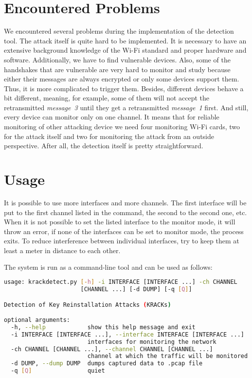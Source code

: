 \section{Encountered Problems}

We encountered several problems during the implementation of the detection tool. The attack itself is quite hard to be implemented. It is necessary to have an extensive background knowledge of the Wi-Fi standard and proper hardware and software. Additionally, we have to find vulnerable devices.
Also, some of the handshakes that are vulnerable are very hard to monitor and study because either their messages are always encrypted or only some devices support them. Thus, it is more complicated to trigger them. Besides, different devices behave a bit different, meaning, for example, some of them will not accept the retransmitted \textit{message~3} until they get a retransmitted \textit{message~1} first. And still, every device can monitor only on one channel. It means that for reliable monitoring of other attacking device we need four monitoring Wi-Fi cards, two for the attack itself and two for monitoring the attack from an outside perspective. 
After all, the detection itself is pretty straightforward. 

\section{Usage}
It is possible to use more interfaces and more channels. The first interface will be put to the first channel listed in the command, the second to the second one, etc. When it is not possible to set the listed interface to the monitor mode, it will throw an error, if none of the interfaces can be set to monitor mode, the process exits. To reduce interference between individual interfaces, try to keep them at least a meter in distance to each other.

\newpage
The system is run as a command-line tool and can be used as follows:

\begin{lstlisting}[language=bash, basicstyle=\tiny]
usage: krackdetect.py [-h] -i INTERFACE [INTERFACE ...] -ch CHANNEL
                      [CHANNEL ...] [-d DUMP] [-q [Q]]

Detection of Key Reinstallation Attacks (KRACKs)

optional arguments:
  -h, --help            show this help message and exit
  -i INTERFACE [INTERFACE ...], --interface INTERFACE [INTERFACE ...]
                        interfaces for monitoring the network
  -ch CHANNEL [CHANNEL ...], --channel CHANNEL [CHANNEL ...]
                        channel at which the traffic will be monitored
  -d DUMP, --dump DUMP  dumps captured data to .pcap file
  -q [Q]                quiet
  

\end{lstlisting}
